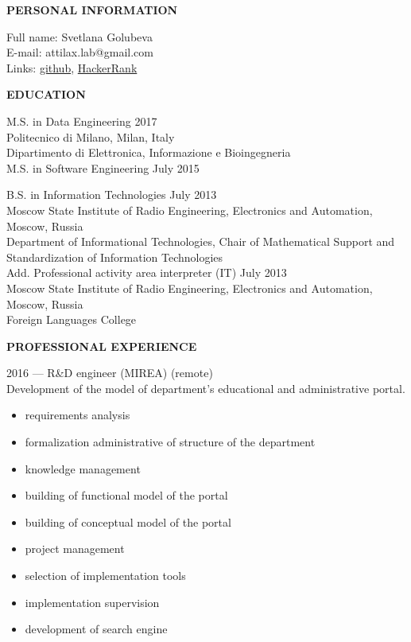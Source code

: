 \documentclass[a4paper,12pt,fullpage]{article}
\begin{document}
\begin{center}
	\textbf{PERSONAL INFORMATION\\}
\end{center}

Full name: \hfill Svetlana Golubeva\\
E-mail: \hfill attilax.lab@gmail.com \\
Links: \hfill  \href{https://github.com/attillax}{github}, 
\href{https://www.hackerrank.com/attillax}{HackerRank}\\

\begin{center}
	\textbf{EDUCATION}
\end{center}	

M.S. in Data Engineering \hfill 2017\\
Politecnico di Milano, Milan, Italy\\
Dipartimento di Elettronica, Informazione e Bioingegneria\\

M.S. in Software Engineering \hfill July 2015

B.S. in Information Technologies \hfill July 2013\\
Moscow State Institute of Radio Engineering, Electronics and Automation, Moscow, Russia\\
Department of Informational Technologies, Chair of Mathematical Support and Standardization of Information Technologies\\

Add. Professional activity area interpreter (IT) \hfill July 2013\\
Moscow State Institute of Radio Engineering, Electronics and Automation, Moscow, Russia\\
Foreign Languages College\\

\begin{center}
	\textbf{PROFESSIONAL EXPERIENCE}
\end{center}	

2016 --- R\&D engineer (MIREA) (remote)\\
Development of the model of department's educational and administrative portal.
\begin{itemize}
	\item requirements analysis
	\item formalization administrative of structure of the department
	\item knowledge management
	\item building of functional model of the portal
	\item building of conceptual model of the portal
	\item project management
	\item selection of implementation tools
	\item implementation supervision
	\item development of search engine
\end{itemize}
\end{document}
